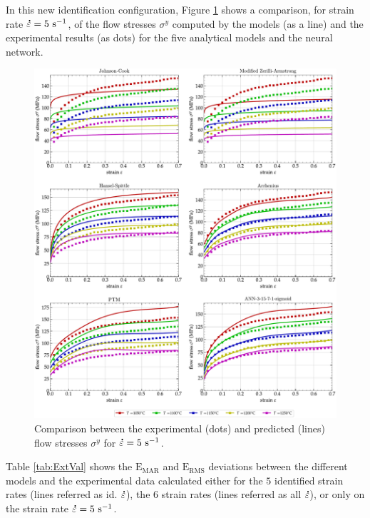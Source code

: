 \documentclass[metals,article,accept,pdftex,moreauthors]{Definitions/mdpi}
\DeclareRobustCommand{\mdot}[1]{\accentset{\mbox{\bfseries .}}{#1}}
\DeclareRobustCommand{\RMSE}{\text{E}_\text{RMS}}
\DeclareRobustCommand{\MARE}{\text{E}_\text{MAR}}
\DeclareRobustCommand{\ps}{\text{s}^{-1}}
\begin{document}
In this new identification configuration, Figure \ref{fig:CompExt} shows a comparison, for strain rate $\mdot\varepsilon=5~\ps$, of the flow stresses $\sigma^y$ computed by the models (as a line) and the experimental results (as dots) for the five analytical models and the neural network.
\begin{figure}[H]

\includegraphics[width=0.98\columnwidth]
{Figures/CompExt}
\caption{{Comparison} %
 between the experimental (dots) and predicted (lines) flow stresses $\sigma^y$ for $\mdot\varepsilon=5~\ps$.}
\label{fig:CompExt}
\end{figure}
Table \ref{tab:ExtVal} shows the $\MARE$ and $\RMSE$ deviations between the different models and the experimental data calculated either for the $5$ identified strain rates (lines referred as id. $\mdot\varepsilon$), the $6$ strain rates (lines referred as all $\mdot\varepsilon$), or only on the strain rate $\mdot\varepsilon=5~\ps$.
\end{document}
